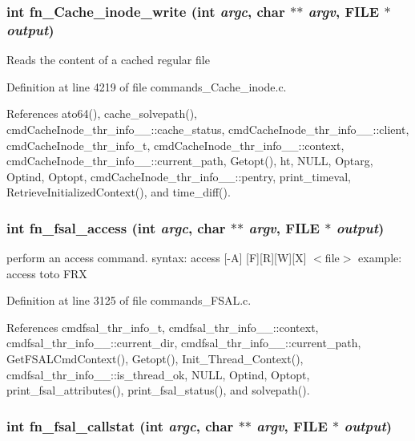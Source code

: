 \subsubsection{\setlength{\rightskip}{0pt plus 5cm}int fn\_\-Cache\_\-inode\_\-write (int {\em argc}, char $\ast$$\ast$ {\em argv}, FILE $\ast$ {\em output})}\label{commands_8h_a56}


Reads the content of a cached regular file 

Definition at line 4219 of file commands\_\-Cache\_\-inode.c.

References ato64(), cache\_\-solvepath(), cmd\-Cache\-Inode\_\-thr\_\-info\_\-\_\-::cache\_\-status, cmd\-Cache\-Inode\_\-thr\_\-info\_\-\_\-::client, cmd\-Cache\-Inode\_\-thr\_\-info\_\-t, cmd\-Cache\-Inode\_\-thr\_\-info\_\-\_\-::context, cmd\-Cache\-Inode\_\-thr\_\-info\_\-\_\-::current\_\-path, Getopt(), ht, NULL, Optarg, Optind, Optopt, cmd\-Cache\-Inode\_\-thr\_\-info\_\-\_\-::pentry, print\_\-timeval, Retrieve\-Initialized\-Context(), and time\_\-diff().
\subsubsection{\setlength{\rightskip}{0pt plus 5cm}int fn\_\-fsal\_\-access (int {\em argc}, char $\ast$$\ast$ {\em argv}, FILE $\ast$ {\em output})}\label{commands_8h_a20}


perform an access command. syntax: access [-A] [F][R][W][X] $<$file$>$ example: access toto FRX 

Definition at line 3125 of file commands\_\-FSAL.c.

References cmdfsal\_\-thr\_\-info\_\-t, cmdfsal\_\-thr\_\-info\_\-\_\-::context, cmdfsal\_\-thr\_\-info\_\-\_\-::current\_\-dir, cmdfsal\_\-thr\_\-info\_\-\_\-::current\_\-path, Get\-FSALCmd\-Context(), Getopt(), Init\_\-Thread\_\-Context(), cmdfsal\_\-thr\_\-info\_\-\_\-::is\_\-thread\_\-ok, NULL, Optind, Optopt, print\_\-fsal\_\-attributes(), print\_\-fsal\_\-status(), and solvepath().
\subsubsection{\setlength{\rightskip}{0pt plus 5cm}int fn\_\-fsal\_\-callstat (int {\em argc}, char $\ast$$\ast$ {\em argv}, FILE $\ast$ {\em output})}\label{commands_8h_a11}


